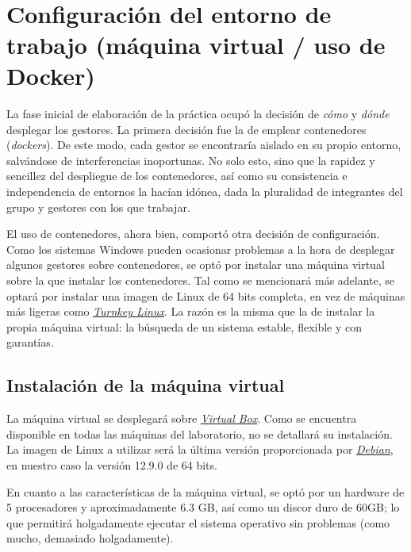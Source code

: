 \documentclass{article}
\begin{document}
\\
\newpage
\section{Configuración del entorno de trabajo (máquina virtual / uso de Docker)}

La fase inicial de elaboración de la práctica ocupó la decisión de \textit{cómo} y \textit{dónde} desplegar los gestores. La primera decisión fue la de emplear contenedores (\textit{dockers}). De este modo, cada gestor se encontraría aislado en su propio entorno, salvándose de interferencias inoportunas. No solo esto, sino que la rapidez y sencillez del despliegue de los contenedores, así como su consistencia e independencia de entornos la hacían idónea, dada la pluralidad de integrantes del grupo y gestores con los que trabajar.

El uso de contenedores, ahora bien, comportó otra decisión de configuración. Como los sistemas Windows pueden ocasionar problemas a la hora de desplegar algunos gestores sobre contenedores, se optó por instalar una máquina virtual sobre la que instalar los contenedores. Tal como se mencionará más adelante, se optará por instalar una imagen de Linux de 64 bits completa, en vez de máquinas más ligeras como \textit{\textcolor{blue}{\href{https://www.turnkeylinux.org/}{Turnkey Linux}}}. La razón es la misma que la de instalar la propia máquina virtual: la búsqueda de un sistema estable, flexible y con garantías.

\subsection{Instalación de la máquina virtual}\label{subsec:Instalación de la máquina virtual}
La máquina virtual se desplegará sobre   \textit{\textcolor{blue}{\href{https://www.oracle.com/es/virtualization/virtualbox/}{Virtual Box}}}. Como se encuentra disponible en todas las máquinas del laboratorio, no se detallará su instalación. La imagen de Linux a utilizar será la última versión proporcionada por \textit{\textcolor{blue}{\href{https://www.debian.org/index.es.html}{Debian}}}, en nuestro caso la versión 12.9.0 de 64 bits.

En cuanto a las características de la máquina virtual, se optó por un hardware de 5 procesadores y aproximadamente 6.3 GB, así como un  discor duro de 60GB; lo que permitirá holgadamente ejecutar el sistema operativo sin problemas (como mucho, demasiado holgadamente).
\end{document}
